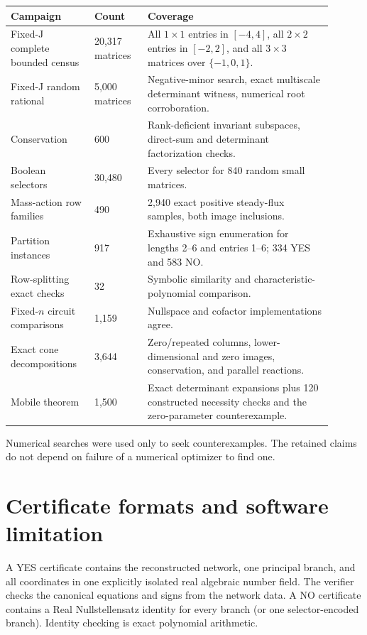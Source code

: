 \documentclass[11pt]{article}
\theoremstyle{definition}
\begin{document}
\begin{center}
\begin{tabular}{p{0.23\linewidth}p{0.15\linewidth}p{0.52\linewidth}}
\toprule
Campaign & Count & Coverage\\
\midrule
Fixed-J complete bounded census & 20,317 matrices & All $1\times1$ entries in $[-4,4]$, all $2\times2$ entries in $[-2,2]$, and all $3\times3$ matrices over $\{-1,0,1\}$.\\
Fixed-J random rational & 5,000 matrices & Negative-minor search, exact multiscale determinant witness, numerical root corroboration.\\
Conservation & 600 & Rank-deficient invariant subspaces, direct-sum and determinant factorization checks.\\
Boolean selectors & 30,480 & Every selector for 840 random small matrices.\\
Mass-action row families & 490 & 2,940 exact positive steady-flux samples, both image inclusions.\\
Partition instances & 917 & Exhaustive sign enumeration for lengths 2--6 and entries 1--6; 334 YES and 583 NO.\\
Row-splitting exact checks & 32 & Symbolic similarity and characteristic-polynomial comparison.\\
Fixed-$n$ circuit comparisons & 1,159 & Nullspace and cofactor implementations agree.\\
Exact cone decompositions & 3,644 & Zero/repeated columns, lower-dimensional and zero images, conservation, and parallel reactions.\\
Mobile theorem & 1,500 & Exact determinant expansions plus 120 constructed necessity checks and the zero-parameter counterexample.\\
\bottomrule
\end{tabular}
\end{center}

Numerical searches were used only to seek counterexamples.  The retained
claims do not depend on failure of a numerical optimizer to find one.

\section{Certificate formats and software limitation}

A YES certificate contains the reconstructed network, one principal branch,
and all coordinates in one explicitly isolated real algebraic number field.
The verifier checks the canonical equations and signs from the network data.
A NO certificate contains a Real Nullstellensatz identity for every branch (or
one selector-encoded branch).  Identity checking is exact polynomial
arithmetic.
\end{document}
